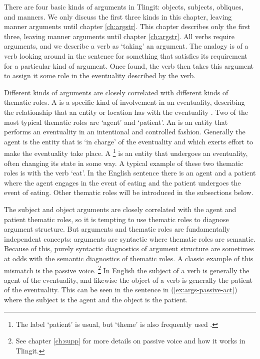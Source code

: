 There are four basic kinds of arguments in Tlingit: objects, subjects, obliques, and manners.
We only discuss the first three kinds in this chapter, leaving manner arguments until chapter \ref{ch:argstr}.
This chapter describes only the first three, leaving manner arguments until chapter \ref{ch:argstr}.
All verbs require arguments, and we describe a verb as ‘taking’ an argument.
The analogy is of a verb looking around in the sentence for something that satisfies its requirement for a particular kind of argument.
Once found, the verb then takes this argument to assign it some role in the eventuality described by the verb.

Different kinds of arguments are closely correlated with different kinds of thematic roles.
A  is a specific kind of involvement in an eventuality, describing the relationship that an entity or location has with the eventuality \parencites{blake:2001}{levin-rappaport-hovav:2005}{davis:2011a}.
Two of the most typical thematic roles are ‘agent’ and ‘patient’.
An  is an entity that performs an eventuality in an intentional and controlled fashion.
Generally the agent is the entity that is ‘in charge’ of the eventuality and which exerts effort to make the eventuality take place.
A \footnote{The label ‘patient’ is usual, but ‘theme’ is also frequently used \parencite[67]{blake:2001}.} is an entity that undergoes an eventuality, often changing its state in some way.
A typical example of these two thematic roles is with the verb ‘eat’.
In the English sentence  there is an agent  and a patient  where the agent engages in the event of eating and the patient undergoes the event of eating.
Other thematic roles will be introduced in the subsections below.

The subject and object arguments are closely correlated with the agent and patient thematic roles, so it is tempting to use thematic roles to diagnose argument structure.
But arguments and thematic roles are fundamentally independent concepts: arguments are syntactic where thematic roles are semantic.
Because of this, purely syntactic diagnostics of argument structure are sometimes at odds with the semantic diagnostics of thematic roles.
A classic example of this mismatch is the passive voice.%
\footnote{See chapter \ref{ch:supp} for more details on passive voice and how it works in Tlingit.}
In English the subject of a verb is generally the agent of the eventuality, and likewise the object of a verb is generally the patient of the eventuality.
This can be seen in the sentence in (\ref{ex:args-passive-act}) where the subject  is the agent and the object  is the patient.

